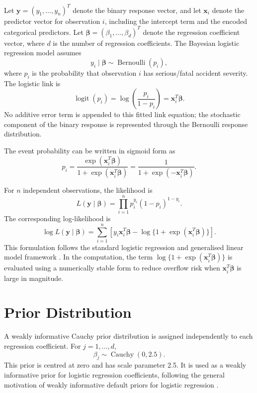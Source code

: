 Let $\mathbf{y}=(y_1,\ldots,y_n)^T$ denote the binary response vector, and let $\mathbf{x}_i$ denote the predictor vector for observation $i$, including the intercept term and the encoded categorical predictors. Let $\boldsymbol{\beta}=(\beta_1,\ldots,\beta_d)^T$ denote the regression coefficient vector, where $d$ is the number of regression coefficients. The Bayesian logistic regression model assumes
\[
y_i \mid \boldsymbol{\beta} \sim \operatorname{Bernoulli}(p_i),
\]
where $p_i$ is the probability that observation $i$ has serious/fatal accident severity. The logistic link is
\[
\operatorname{logit}(p_i)
=
\log\left(\frac{p_i}{1-p_i}\right)
=
\mathbf{x}_i^T\boldsymbol{\beta}.
\]
No additive error term is appended to this fitted link equation; the stochastic component of the binary response is represented through the Bernoulli response distribution.

The event probability can be written in sigmoid form as
\[
p_i
=
\frac{\exp(\mathbf{x}_i^T\boldsymbol{\beta})}
{1+\exp(\mathbf{x}_i^T\boldsymbol{\beta})}
=
\frac{1}{1+\exp(-\mathbf{x}_i^T\boldsymbol{\beta})}.
\]

For $n$ independent observations, the likelihood is
\[
L(\mathbf{y}\mid \boldsymbol{\beta})
=
\prod_{i=1}^{n}
p_i^{y_i}(1-p_i)^{1-y_i}.
\]
The corresponding log-likelihood is
\[
\log L(\mathbf{y}\mid \boldsymbol{\beta})
=
\sum_{i=1}^{n}
\left[
y_i\mathbf{x}_i^T\boldsymbol{\beta}
-
\log\{1+\exp(\mathbf{x}_i^T\boldsymbol{\beta})\}
\right].
\]
This formulation follows the standard logistic regression and generalised linear model framework \cite{mccullagh1989generalized,hosmer2013applied}. In the computation, the term $\log\{1+\exp(\mathbf{x}_i^T\boldsymbol{\beta})\}$ is evaluated using a numerically stable form to reduce overflow risk when $\mathbf{x}_i^T\boldsymbol{\beta}$ is large in magnitude.

\section{Prior Distribution}

A weakly informative Cauchy prior distribution is assigned independently to each regression coefficient. For $j=1,\ldots,d$,
\[
\beta_j \sim \operatorname{Cauchy}(0, 2.5).
\]
This prior is centred at zero and has scale parameter 2.5. It is used as a weakly informative prior for logistic regression coefficients, following the general motivation of weakly informative default priors for logistic regression \cite{gelman2008weakly,ghosh2015cauchy}.

